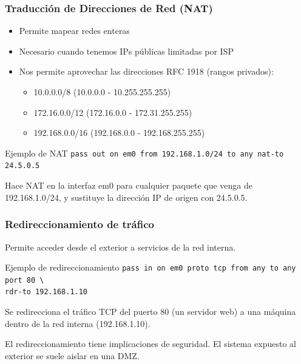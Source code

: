 \documentclass{beamer}
\begin{document}

\begin{frame}
\frametitle{Traducción de Direcciones de Red (NAT)}

\begin{itemize}
\item Permite mapear redes enteras
\item Necesario cuando tenemos IPs públicas limitadas por ISP
\item Nos permite aprovechar las direcciones RFC 1918 (rangos privados):
	\begin{itemize}
	\item	10.0.0.0/8   \hspace{4mm}    (10.0.0.0 - 10.255.255.255)
	\item	172.16.0.0/12   \hspace{4mm} (172.16.0.0 - 172.31.255.255)
	\item	192.168.0.0/16 \hspace{4mm}  (192.168.0.0 - 192.168.255.255)
	\end{itemize}
\end{itemize}

\begin{block}{Ejemplo de NAT}
\tt pass out on em0 from 192.168.1.0/24 to any nat-to 24.5.0.5
\end{block}

\footnotesize
Hace NAT en la interfaz em0 para cualquier paquete que venga de 192.168.1.0/24, y sustituye la dirección IP de origen con 24.5.0.5.

\end{frame}




\begin{frame}
\frametitle{Redireccionamiento de tráfico}

Permite acceder desde el exterior a servicios de la red interna.

\begin{block}{Ejemplo de redireccionamiento}
\tt pass in on em0 proto tcp from any to any port 80 \textbackslash \\
\hspace{7mm} rdr-to 192.168.1.10
\end{block}
\footnotesize
Se redirecciona el tráfico TCP del puerto 80 (un servidor web) a una máquina dentro de la red interna (192.168.1.10). 

\bigskip
\normalsize
\begin{center}
El redireccionamiento tiene \alert{implicaciones de seguridad}. El sistema expuesto al exterior se suele aislar en una \alert{DMZ}.
\end{center}

\end{frame}
\end{document}
